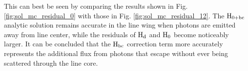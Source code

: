 \documentclass[onecolumn]{aastex63}
\begin{document}
This can best be seen by comparing the results shown in Fig. \ref{fig:sol_mc_residual_0} with those in Fig. \ref{fig:sol_mc_residual_12}. The $\rm H_{0+bc}$ analytic solution remains accurate in the line wing when photons are emitted away from line center, while the residuals of $\rm H_d$ and $\rm H_0$ become noticeably larger. It can be concluded that the $\rm H_{bc}$ correction term more accurately represents the additional flux from photons that escape without ever being scattered through the line core.

{}

\end{document}
